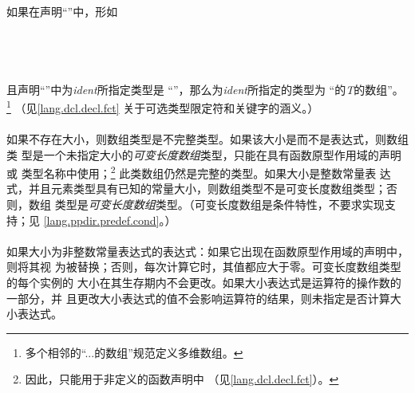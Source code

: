 \paragraph{}
如果在声明``''中，形如                                        \\
\mbox{\hspace{4em}\tm{D[}  \tm{]}}                                    \\
\mbox{\hspace{4em}\tm{D[static}  \tm{]}}                                              \\
\mbox{\hspace{4em}\tm{D[}  
   \tm{]}}                                          \\
\mbox{\hspace{4em}\tm{D[}  \tm{*]}}         \\
且声明``''中为\textit{ident}所指定类型是
``''，那么为\textit{ident}所指定的类型为
``的\textit{T}的数组''。
\footnote{多个相邻的``...的数组''规范定义多维数组。} （见\ref{lang.dcl.decl.fct}
关于可选类型限定符和关键字的涵义。）

\paragraph{}
如果不存在大小，则数组类型是不完整类型。如果该大小是\tm{*}而不是表达式，则数组类
型是一个未指定大小的\textit{可变长度数组}类型，只能在具有函数原型作用域的声明或
类型名称中使用；\footnote{因此，\tm{*}只能用于非定义的函数声明中
（见\ref{lang.dcl.decl.fct}）。} 此类数组仍然是完整的类型。如果大小是整数常量表
达式，并且元素类型具有已知的常量大小，则数组类型不是可变长度数组类型；否则，数组
类型是\textit{可变长度数组}类型。（可变长度数组是条件特性，不要求实现支持；见
\ref{lang.ppdir.predef.cond}。）

\paragraph{}
如果大小为非整数常量表达式的表达式：如果它出现在函数原型作用域的声明中，则将其视
为被\tm{*}替换；否则，每次计算它时，其值都应大于零。可变长度数组类型的每个实例的
大小在其生存期内不会更改。如果大小表达式是运算符的操作数的一部分，并
且更改大小表达式的值不会影响运算符的结果，则未指定是否计算大小表达式。

